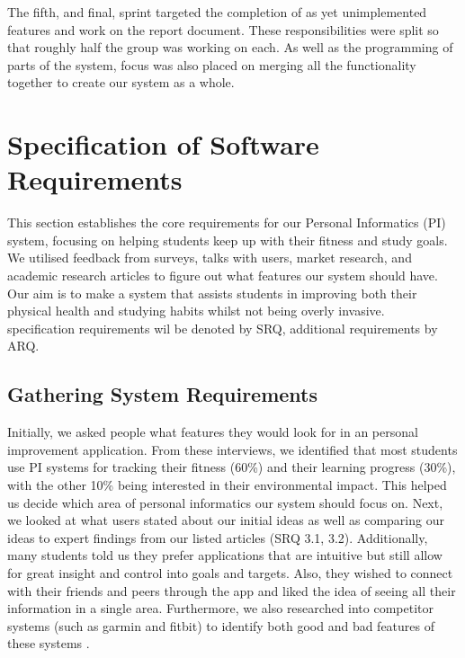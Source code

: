 \documentclass[12pt]{article}
\begin{document}
The fifth, and final, sprint targeted the completion of as yet unimplemented
features and work on the report document. These responsibilities were split so
that roughly half the group was working on each. As well as the programming of
parts of the system, focus was also placed on merging all the functionality
together to create our system as a whole.


\newpage
\section{Specification of Software Requirements}

This section establishes the core requirements for our Personal Informatics
(PI) system, focusing on helping students keep up with their fitness and study
goals. We utilised feedback from surveys, talks with users, market research,
and academic research articles to figure out what features our system should have. Our
aim is to make a system that assists students in improving both their physical
health and studying habits whilst not being overly invasive.\\ 

specification requirements wil be denoted by SRQ, additional requirements by ARQ.


\subsection{Gathering System Requirements}

Initially, we asked people what features they would look for in an personal
improvement application. From these interviews, we identified that most
students use PI systems for tracking their fitness (60\%) and their learning
progress (30\%), with the other 10\% being interested in their environmental
impact. This helped us decide which area of personal informatics our system
should focus on. Next, we looked at what users stated about our initial ideas
as well as comparing our ideas to expert findings from our listed articles (SRQ 3.1, 3.2).
Additionally, many students told us they prefer applications that are intuitive
but still allow for great insight and control into goals and targets. Also,
they wished to connect with their friends and peers through the app and liked
the idea of seeing all their information in a single area. Furthermore, we also
researched into competitor systems (such as garmin and fitbit) to identify both
good and bad features of these systems .\par
\end{document}
